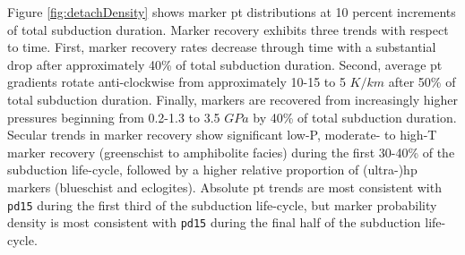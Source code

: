Figure \ref{fig:detachDensity} shows marker \gls{pt} distributions at 10 percent increments of total subduction duration. Marker recovery exhibits three trends with respect to time. First, marker recovery rates decrease through time with a substantial drop after approximately 40\% of total subduction duration. Second, average \gls{pt} gradients rotate anti-clockwise from approximately 10-15 to 5 \(K/km\) after 50\% of total subduction duration. Finally, markers are recovered from increasingly higher pressures beginning from 0.2-1.3 to 3.5 \(GPa\) by 40\% of total subduction duration. Secular trends in marker recovery show significant low-P, moderate- to high-T marker recovery (greenschist to amphibolite facies) during the first 30-40\% of the subduction life-cycle, followed by a higher relative proportion of (ultra-)\gls{hp} markers (blueschist and eclogites). Absolute \gls{pt} trends are most consistent with \texttt{pd15} during the first third of the subduction life-cycle, but marker probability density is most consistent with \texttt{pd15} during the final half of the subduction life-cycle.



